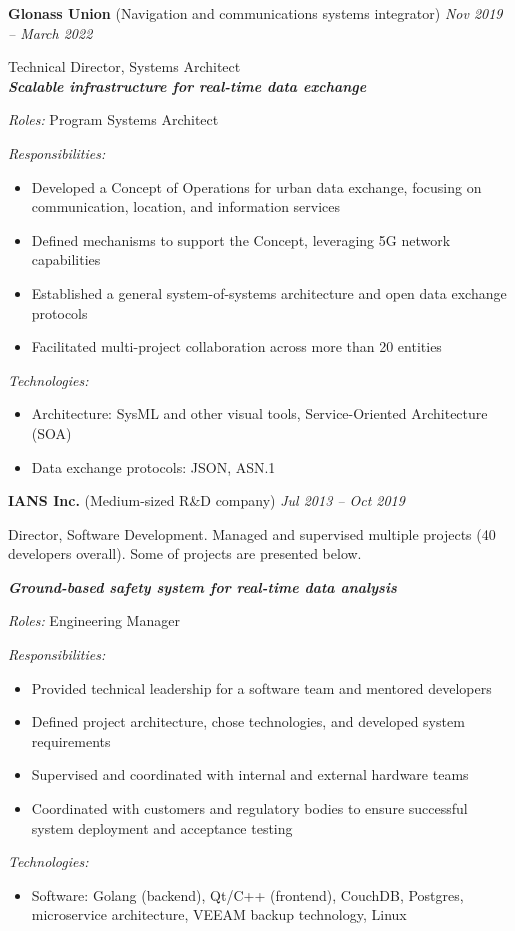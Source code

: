 \documentclass[a4paper]{article}
\newcommand{\project}[4]{

	\textbf{\textit{#1}}
    \vspace{2mm}

    \textit{Roles:} #2
    \vspace{2mm}

    \textit{Responsibilities:}
	\begin{itemize}
	    \setlength{\itemindent}{.5cm}
	    #3
    \end{itemize}
    
	\textit{Technologies:}
	\begin{itemize}
		\setlength{\itemindent}{.5cm}
		#4
	\end{itemize}
}
\begin{document}
    \vspace{2mm}

	\textbf{Glonass Union} (Navigation and communications systems integrator) \hfill \textit{Nov 2019 -- March 2022}

    \vspace{2mm}
	Technical Director, Systems Architect \\
	
	\project{Scalable infrastructure for real-time data exchange}{
		Program Systems Architect
	}{
		\item Developed a Concept of Operations for urban data exchange, focusing on communication, location, and information services
		\item Defined mechanisms to support the Concept, leveraging 5G network capabilities
		\item Established a general system-of-systems architecture and open data exchange protocols
		\item Facilitated multi-project collaboration across more than 20 entities
	}{
		\item Architecture: SysML and other visual tools, Service-Oriented Architecture (SOA)
		\item Data exchange protocols: JSON, ASN.1
	}
    
    \vspace{3mm}
    \textbf{IANS Inc.} (Medium-sized R\&D company) \hfill \textit{ Jul 2013 -- Oct 2019}

    \vspace{3mm}
	Director, Software Development. Managed and supervised multiple projects (40 developers overall). Some of projects are presented below.\\
    \vspace{2mm}

	\project{Ground-based safety system for real-time data analysis}{
		Engineering Manager
	}{
		\item Provided technical leadership for a software team and mentored developers
		\item Defined project architecture, chose technologies, and developed system requirements
		\item Supervised and coordinated with internal and external hardware teams
		\item Coordinated with customers and regulatory bodies to ensure successful system deployment and acceptance testing
	}{
		\item Software: Golang (backend), Qt/C++ (frontend), CouchDB, Postgres, microservice architecture, VEEAM backup technology, Linux
	}
 
\end{document}
